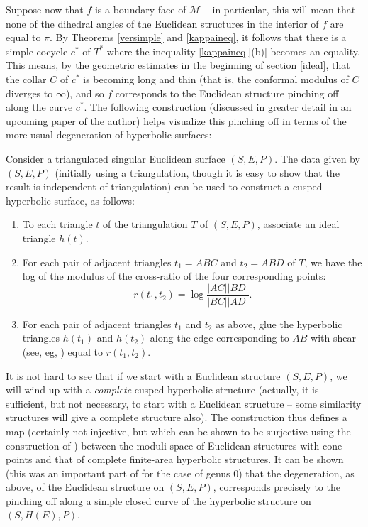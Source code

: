 \documentclass{acmart}
\begin{document}
Suppose now that $f$ is a boundary face of $\mathcal{M}$ -- in
particular, this will mean that none of the dihedral angles of the
Euclidean structures in the interior of $f$ are equal to $\pi$. By
Theorems \ref{versimple} and \ref{kappaineq}, it follows that there is
a simple cocycle $c^*$ of $T^*$ where the inequality \ref{kappaineq}[(b)]
becomes an equality. This means, by the geometric estimates in the
beginning of section \ref{ideal},  that the collar $C$ of $c^*$ is
becoming long and thin (that is, the conformal modulus of $C$ diverges
to $\infty$), and so $f$ corresponds to the Euclidean structure
pinching off along the curve $c^*$. The following construction
(discussed in greater detail in an upcoming paper of the author)
helps visualize this pinching off in terms of the more usual
degeneration of hyperbolic surfaces:

Consider a triangulated singular Euclidean surface $(S, E, P)$. 
The data given by $(S, E, P)$ (initially using a triangulation, though
it is easy to show that the result is independent of triangulation)
can be used to construct a cusped hyperbolic surface, as follows:

\begin{enumerate}

\item To each triangle $t$ of the triangulation $T$ of $(S, E, P)$,
  associate an ideal triangle $h(t)$. 

\item For each pair of adjacent triangles $t_1=ABC$ and $t_2=ABD$ of
  $T$, we have the log of the modulus of the cross-ratio of the four
  corresponding points: $$r(t_1, t_2) = \log
  \frac{|AC||BD|}{|BC||AD|}.$$

\item For each pair of adjacent triangles $t_1$ and $t_2$ as above,
  glue the hyperbolic triangles $h(t_1)$ and $h(t_2)$ along the 
  edge corresponding to $AB$ with shear   (see, eg, \cite{rivid})
  equal to $r(t_1, t_2).$ 

\end{enumerate}

It is not hard to see that if we start with a Euclidean structure $(S,
E, P)$, we will wind up with a \emph{complete} cusped hyperbolic
structure (actually, it is sufficient, but not necessary, to start
with a Euclidean structure -- some similarity structures will give a
complete structure also). The construction thus defines a map
(certainly not injective, but which can be shown to be surjective
using the construction of \cite{penner,ep,np})
between the moduli space of Euclidean structures with cone points and
that of complete finite-area hyperbolic structures. It can be shown
(this was an important part of \cite{rh,steiner} for the case of genus
$0$) that the degeneration, as above, of the Euclidean structure on
$(S, E, P)$, corresponds precisely to the pinching off along a simple
closed curve of the hyperbolic structure on $(S, H(E), P)$.
\end{document}
